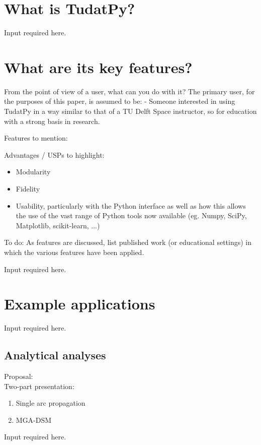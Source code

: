 \documentclass[]{IAC_style_template_original}
\begin{document}
\section{What is TudatPy?}
    \lbrack Input required here.\rbrack

\section{What are its key features?}

    From the point of view of a user, what can you do with it?
    The primary user, for the purposes of this paper, is assumed to be:
    - Someone interested in using TudatPy in a way similar to that of a TU Delft Space instructor, so for education with a strong basis in research.

    Features to mention:

    Advantages / USPs to highlight:
    \begin{itemize}
        \item Modularity
        \item Fidelity
        \item Usability, particularly with the Python interface as well as how this allows the use of the vast range of Python tools now available (eg. Numpy, SciPy, Matplotlib, scikit-learn, ...)
    \end{itemize}

    To do:
    \lbrack \rbrack As features are discussed, list published work (or educational settings) in which the various features have been applied.

    \lbrack Input required here.\rbrack

\section{Example applications}
    \lbrack Input required here.\rbrack

    \subsection{Analytical analyses}
    Proposal: \\
    Two-part presentation: 
    \begin{enumerate}
        \item Single arc propagation
        \item MGA-DSM
    \end{enumerate}
    \lbrack Input required here.\rbrack
\end{document}
